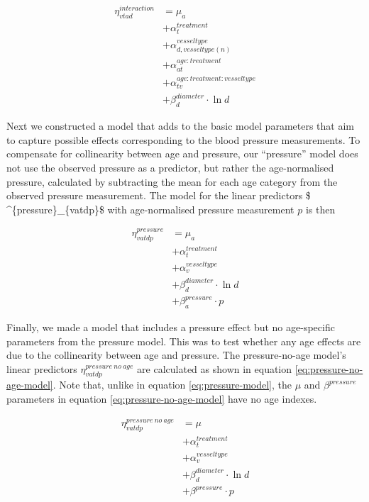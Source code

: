 \documentclass[
  letterpaper,
  DIV=11,
  numbers=noendperiod,
  oneside]{scrartcl}
\theoremstyle{plain}
\theoremstyle{remark}
\begin{document}
\begin{align}
        \label{eq:interaction}
    \eta^{interaction}_{vtad} &= \mu_{a} \\
      &+ \alpha^{treatment}_{t} \nonumber  \\
      &+ \alpha^{vesseltype}_{d,vesseltype(n)} \\
      &+ \alpha^{age:treatment}_{at} \nonumber \\
      &+ \alpha^{age:treatment:vesseltype}_{tv} \nonumber \\
    &+ \beta^{diameter}_{d} \cdot \ln{d} \nonumber
\end{align}

Next we constructed a model that adds to the basic model parameters that
aim to capture possible effects corresponding to the blood pressure
measurements. To compensate for collinearity between age and pressure,
our ``pressure'' model does not use the observed pressure as a
predictor, but rather the age-normalised pressure, calculated by
subtracting the mean for each age category from the observed pressure
measurement. The model for the linear predictors \$
\eta\^{}\{pressure\}\_\{vatdp\}\$ with age-normalised pressure
measurement \(p\) is then

\begin{align}
        \label{eq:pressure-model}
    \eta^{pressure}_{vatdp} &= \mu_{a} \\
      &+ \alpha^{treatment}_{t} \nonumber \\
      &+ \alpha^{vesseltype}_{v} \nonumber \\
      &+ \beta^{diameter}_{d} \cdot \ln{d} \nonumber \\
      &+ \beta^{pressure}_{a} \cdot p \nonumber
\end{align}

Finally, we made a model that includes a pressure effect but no
age-specific parameters from the pressure model. This was to test
whether any age effects are due to the collinearity between age and
pressure. The pressure-no-age model's linear predictors
\(\eta^{pressure\ no\ age}_{vatdp}\) are calculated as shown in equation
\eqref{eq:pressure-no-age-model}. Note that, unlike in equation
\eqref{eq:pressure-model}, the \(\mu\) and \(\beta^{pressure}\)
parameters in equation \eqref{eq:pressure-no-age-model} have no age
indexes.

\begin{align}
        \label{eq:pressure-no-age-model}
    \eta^{pressure\ no\ age}_{vatdp} &= \mu \\
      &+ \alpha^{treatment}_{t} \nonumber \\
      &+ \alpha^{vesseltype}_{v} \nonumber  \\
      &+ \beta^{diameter}_{d} \cdot \ln{d} \nonumber \\
      &+ \beta^{pressure} \cdot p \nonumber
\end{align}
\end{document}
